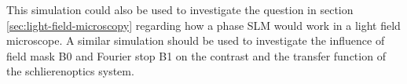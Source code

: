 \documentclass[oneside,a4paper,12pt,BCOR20mm,DIV14]{scrbook} %
\begin{document}
This simulation could also be used to investigate the question in
section \ref{sec:light-field-microscopy} regarding how a phase SLM
would work in a light field microscope. A similar simulation should be
used to investigate the influence of field mask B0 and Fourier stop B1
on the contrast and the transfer function of the schlierenoptics
system.












\appendix



%
\end{document}
